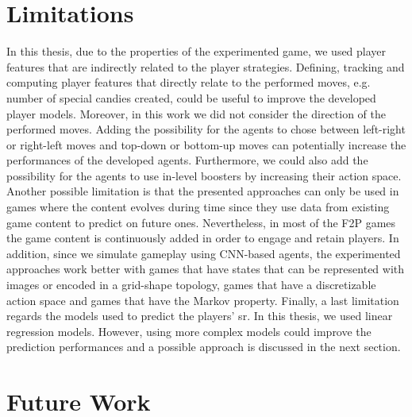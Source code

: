 \section{Limitations}
In this thesis, due to the properties of the experimented game, we used player features that are indirectly related to the player strategies. Defining, tracking and computing player features that directly relate to the performed moves, e.g. number of special candies created, could be useful to improve the developed player models. Moreover, in this work we did not consider the direction of the performed moves. Adding the possibility for the agents to chose between left-right or right-left moves and top-down or bottom-up moves can potentially increase the performances of the developed agents. Furthermore, we could also add the possibility for the agents to use in-level boosters by increasing their action space.
Another possible limitation is that the presented approaches can only be used in games where the content evolves during time since they use data from existing game content to predict on future ones. Nevertheless, in most of the \acs{F2P} games the game content is continuously added in order to engage and retain players. In addition, since we simulate gameplay using \acs{CNN}-based agents, the experimented approaches work better with games that have states that can be represented with images or encoded in a grid-shape topology, games that have a discretizable action space and games that have the Markov property. Finally, a last limitation regards the models used to predict the players' \acs{sr}. In this thesis, we used linear regression models. However, using more complex models could improve the prediction performances and a possible approach is discussed in the next section.  

\section{Future Work}

